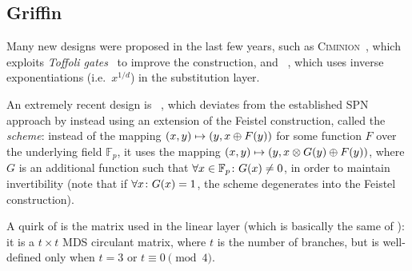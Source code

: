 \subsection{Griffin}
Many new designs were proposed in the last few years, such as 
\textsc{Ciminion}~\cite{DobraunigGGK2021}, which exploits \emph{Toffoli gates}~\cite{Toffoli1980} 
to improve the construction, and \Rescue~\cite{AlyABDS2019}, which uses inverse 
exponentiations (i.e.\  \(x^{1/d}\)) in the substitution layer.

An extremely recent design is \Griffin~\cite{GrassiHRSWW2022}, which deviates from the
established SPN approach by instead using an extension of the Feistel construction, called the 
\emph{\Horst{} scheme}: instead of the mapping 
\(\Tuple{x, y} \mapsto \Tuple{y, x \oplus \call{F}{y}}\) for some function \(F\) over the 
underlying field \(\mathbb{F}_p\), it uses the mapping 
\(\Tuple{x, y} \mapsto \Tuple{y, x \otimes \call{G}{y} \oplus \call{F}{y}}\), where \(G\) is an 
additional function such that \(\forall x \in \mathbb{F}_p\colon \call{G}{x} \neq 0\), in order 
to maintain invertibility (note that if \(\forall x\colon \call{G}{x} = 1\), the \Horst{} scheme
degenerates into the Feistel construction).

A quirk of \Griffin{} is the matrix used in the linear layer (which is basically the same of 
\Poseidon): it is a \(t \times t\) MDS circulant matrix, where \(t\) is the number of branches, 
but is well-defined only when \(t = 3\) or \(t \equiv 0 \pmod{4}\).

